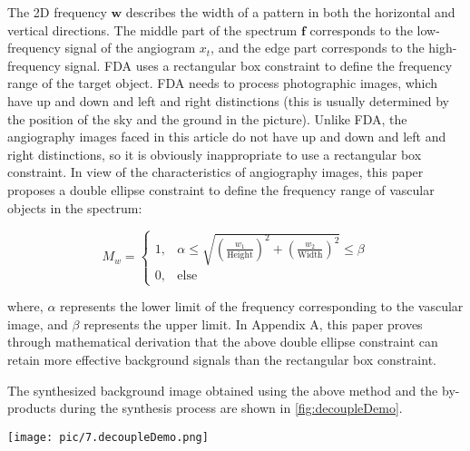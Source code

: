 The 2D frequency $\mathbf{w}$ describes the width of a pattern in both the horizontal and vertical directions. The middle part of the spectrum $\mathbf{f}$ corresponds to the low-frequency signal of the angiogram $x_t$, and the edge part corresponds to the high-frequency signal. 
FDA\cite{FDA} uses a rectangular box constraint to define the frequency range of the target object. 
FDA needs to process photographic images, 
which have up and down and left and right distinctions (this is usually determined by the position of the sky and the ground in the picture). 
Unlike FDA, the angiography images faced in this article do not have up and down and left and right distinctions, 
so it is obviously inappropriate to use a rectangular box constraint. 
In view of the characteristics of angiography images, this paper proposes a double ellipse constraint to define the frequency range of vascular objects in the spectrum:

\begin{equation}
  M_w = 
  \begin{cases} 
  1, & \alpha \leq \sqrt{\left(\frac{w_1}{\text{Height}}\right)^2 + \left(\frac{w_2}{\text{Width}}\right)^2} \leq \beta \\
  0, & \text{else}
  \end{cases}
\end{equation}
  
where, $\alpha$ represents the lower limit of the frequency corresponding to the vascular image, and $\beta$ represents the upper limit. In Appendix A, this paper proves through mathematical derivation that the above double ellipse constraint can retain more effective background signals than the rectangular box constraint.

The synthesized background image obtained using the above method and the by-products during the synthesis process are shown in \cref{fig:decoupleDemo}.

\begin{figure*}[htbp]
  \centering
  \texttt{[image: pic/7.decoupleDemo.png]}
  \caption{Blood vessel corresponding frequency range}
  \label{fig:decoupleDemo}
\end{figure*}


